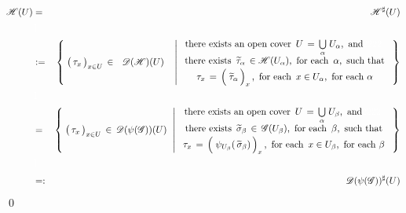 \begin{eqnarray*}
\mathscr{H}(U)
& = &
	\mathscr{H}^{\sharp}(U)
\\ & {\color{white}\textnormal{\large$1$}} &
\\
& := &
	\left\{\;
		\left(\,\overset{{\color{white}.}}{\tau_{x}}\,\right)_{x \in U} \,\in\, {\color{white}1}\mathscr{D}(\mathscr{H})(U){\color{white}1}
		\;\,\left\vert\;
			\begin{array}{c}
			\textnormal{there exists an open cover \,$U \,=\, \underset{\alpha}{\bigcup}\;U_{\alpha}$,\, and{\color{white}2222.}}
			\\
			\textnormal{there exists \,$\widetilde{\tau}_{\alpha} \,\in \mathscr{H}(U_{\alpha})$,\, for each \,$\alpha$,\, such that}
			\\
			\textnormal{$\overset{{\color{white}\textnormal{\normalsize$1$}}}{\tau_{x}} \,=\, \left(\;\overset{{\color{white}.}}{\widetilde{\tau}_{\alpha}}\,\right)_{x}$\,,\, for each \,$x \in U_{\alpha}$,\, for each $\alpha$}
			\end{array}
			\right.
		\,\right\}
\\ & {\color{white}\textnormal{\large$1$}} &
\\
& = &
	\left\{\;
		\left(\,\overset{{\color{white}.}}{\tau_{x}}\,\right)_{x \in U} \,\in\, \mathscr{D}(\psi(\mathscr{G}))(U)
		\;\,\left\vert\;
			\begin{array}{c}
			\textnormal{there exists an open cover \,$U \,=\, \underset{\alpha}{\bigcup}\;U_{\beta}$,\, and{\color{white}2222.}}
			\\
			\textnormal{there exists \,$\widetilde{\sigma}_{\beta} \,\in\, \mathscr{G}(U_{\beta})$,\, for each \,$\beta$,\, such that}
			\\
			\textnormal{$\overset{{\color{white}\textnormal{\normalsize$1$}}}{\tau_{x}} \,=\, \left(\;\overset{{\color{white}.}}{\psi_{U_{\beta}}(\,\widetilde{\sigma}_{\beta})}\,\right)_{x}$\,,\, for each \,$x \in U_{\beta}$,\, for each $\beta$}
			\end{array}
			\right.
		\,\right\}
\\ & {\color{white}\textnormal{\large$1$}} &
\\
& =: &
	\mathscr{D}(\psi(\mathscr{G}))^{\sharp}(U)
\end{eqnarray*}
\qed


